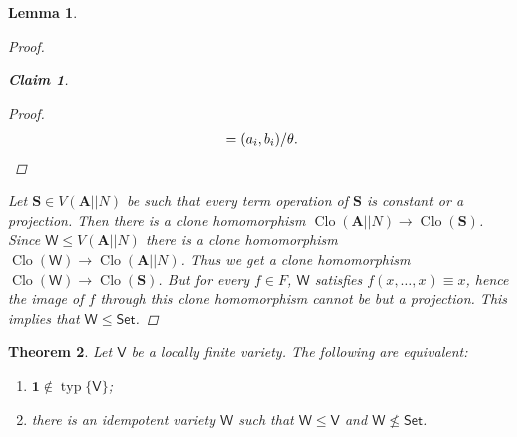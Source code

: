 \documentclass{amsart}
\theoremstyle{plain}
\newtheorem{theorem}{Theorem}[section]
\newtheorem{lemma}[theorem]{Lemma}
\newtheorem{claim}{Claim}
\theoremstyle{definition}
\theoremstyle{remark}
\DeclareMathOperator{\Clo}{Clo}
\DeclareMathOperator{\typ}{typ}
\begin{document}
\begin{lemma}
\begin{proof}
\begin{claim}
\begin{proof}
\begin{align*}
                   & = (a_i, b_i) / \theta \text{.} \qedhere \\
                \end{align*}
            \end{proof}
        \end{claim}
        Let $\mathbf{S} \in V(\mathbf{A}||N)$ be such that every term operation of $\mathbf{S}$ is constant or a projection. 
        Then there is a clone homomorphism $\Clo(\mathbf{A}||N) \to \Clo(\mathbf{S})$.
        Since $\mathsf{W} \le V(\mathbf{A}||N)$ there is a clone homomorphism $\Clo(\mathsf{W}) \to \Clo(\mathbf{A}||N)$. 
        Thus we get a clone homomorphism $\Clo(\mathsf{W}) \to \Clo(\mathbf{S})$. 
        But for every $f \in F$, $\mathsf{W}$ satisfies $f(x, \ldots, x) \equiv x$, hence the image of $f$ through this clone homomorphism cannot be but a projection. 
        This implies that $\mathsf{W} \le \mathsf{Set}$. 
    \end{proof}
\end{lemma}

\begin{theorem}
    \label{omitting_typ1}
    Let $\mathsf{V}$ be a locally finite variety. 
    The following are equivalent: 
    \begin{enumerate}
        \item $\mathbf{1} \notin \typ\{\mathsf{V}\}$; 
        \item there is an idempotent variety $\mathsf{W}$ such that $\mathsf{W} \le \mathsf{V}$ and $\mathsf{W} \nleq \mathsf{Set}$. 
    \end{enumerate}
\end{theorem}
\end{document}
